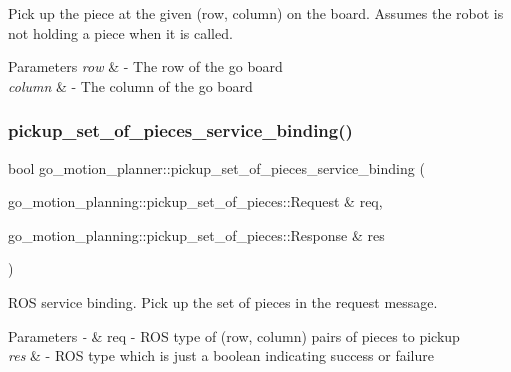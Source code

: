 Pick up the piece at the given (row, column) on the board. Assumes the robot is not holding a piece when it is called. 


\begin{DoxyParams}{Parameters}
{\em row} & -\/ The row of the go board \\
\hline
{\em column} & -\/ The column of the go board \\
\hline
\end{DoxyParams}
\mbox{\label{classgo__motion__planner_a89fdde820a08474e8b43d1ef5b69e8fd}} 
\subsubsection{\texorpdfstring{pickup\+\_\+set\+\_\+of\+\_\+pieces\+\_\+service\+\_\+binding()}{pickup\_set\_of\_pieces\_service\_binding()}}
{\footnotesize\ttfamily bool go\+\_\+motion\+\_\+planner\+::pickup\+\_\+set\+\_\+of\+\_\+pieces\+\_\+service\+\_\+binding (\begin{DoxyParamCaption}\item[{go\+\_\+motion\+\_\+planning\+::pickup\+\_\+set\+\_\+of\+\_\+pieces\+::\+Request \&}]{req,  }\item[{go\+\_\+motion\+\_\+planning\+::pickup\+\_\+set\+\_\+of\+\_\+pieces\+::\+Response \&}]{res }\end{DoxyParamCaption})}



R\+OS service binding. Pick up the set of pieces in the request message. 


\begin{DoxyParams}{Parameters}
{\em -\/} & req -\/ R\+OS type of (row, column) pairs of pieces to pickup \\
\hline
{\em res} & -\/ R\+OS type which is just a boolean indicating success or failure \\
\hline
\end{DoxyParams}
\mbox{\label{classgo__motion__planner_a2b49683bb6488c9cab3e22a40e4e854e}} 

